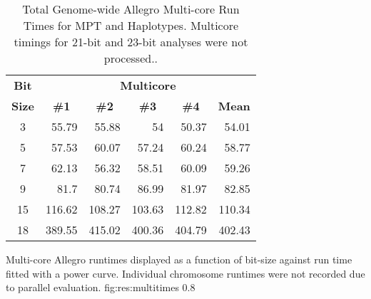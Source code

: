 \begin{table}[h]
\begin{center}
\begin{tabular}{crrrrr}\toprule
\textbf{Bit}  & \multicolumn{5}{c}{\textbf{Multicore}}  \\
\textbf{Size} & \multicolumn{1}{c}{\textbf{\#1}} & \multicolumn{1}{c}{\textbf{\#2}} & \multicolumn{1}{c}{\textbf{\#3}} & \multicolumn{1}{c}{\textbf{\#4}} & \multicolumn{1}{c}{\textbf{Mean}} \\
\midrule
3             & 55.79                            & 55.88                            & 54                               & 50.37                            & 54.01                             \\
5             & 57.53                            & 60.07                            & 57.24                            & 60.24                            & 58.77                             \\
7             & 62.13                            & 56.32                            & 58.51                            & 60.09                            & 59.26                             \\
9             & 81.7                             & 80.74                            & 86.99                            & 81.97                            & 82.85                             \\
15            & 116.62                           & 108.27                           & 103.63                           & 112.82                           & 110.34                            \\
18            & 389.55                           & 415.02                           & 400.36                           & 404.79                           & 402.43                            \\
\hline
\end{tabular}
\end{center}
\vspace{-15pt}
\caption{Total Genome-wide Allegro Multi-core Run Times for MPT and Haplotypes. Multicore timings for 21-bit and 23-bit analyses were not processed..}\label{table:res:allegromultiruntimes}
\end{table}

	{Multi-core Allegro runtimes displayed as a function of bit-size against run time fitted with a power curve. Individual chromosome runtimes were not recorded due to parallel evaluation.}
	{fig:res:multitimes}
	{0.8}

